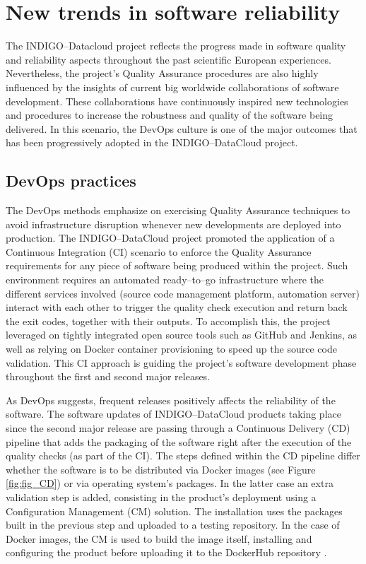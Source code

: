 \documentclass[journal]{IEEEtran}
\begin{document}
\section{New trends in software reliability}
\label{sec:ntsr}

The INDIGO--Datacloud project reflects the progress made in software
quality and reliability aspects throughout the past scientific European
experiences. Nevertheless, the project’s Quality Assurance procedures are also
highly influenced by the insights of current big worldwide collaborations of
software development. These collaborations have continuously inspired new
technologies and procedures to increase the robustness and quality of the
software being delivered. In this scenario, the DevOps culture is one of the
major outcomes that has been progressively adopted in the INDIGO--DataCloud
project.

\subsection{DevOps practices}
\label{sec:devops}

The DevOps methods emphasize on exercising Quality Assurance techniques to
avoid infrastructure disruption whenever new developments are deployed into
production. The INDIGO--DataCloud project promoted the application of a Continuous Integration (CI)
scenario to enforce the Quality Assurance requirements for any piece of
software being produced within the project. Such environment requires an
automated ready--to--go infrastructure where the different services involved
(source code management platform, automation server) interact with each other
to trigger the quality check execution and return back the exit codes, together
with their outputs. To accomplish this, the project leveraged on tightly
integrated open source tools such as GitHub and Jenkins, as well as relying on
Docker container provisioning to speed up the source code validation. This CI
approach is guiding the project’s software development phase throughout the
first and second major releases.

As DevOps suggests, frequent releases positively affects the reliability of the
software. The software updates of INDIGO--DataCloud products taking place since
the second major release are passing through a Continuous Delivery (CD)
pipeline that adds the packaging of the software right after the execution of
the quality checks (as part of the CI). 
The steps defined within the CD
pipeline differ whether the software is to be distributed via Docker
images (see Figure \ref{fig:fig_CD}) or via operating system’s packages. In the latter case an extra
validation step is added, consisting in the product’s deployment using a
Configuration Management (CM) solution. The installation uses the packages
built in the previous step and uploaded to a testing
repository. In the case of Docker images, the CM is used to build the image
itself, installing and configuring the product before uploading it to the
DockerHub repository \cite{indigo-dockerhub}. 
\end{document}

